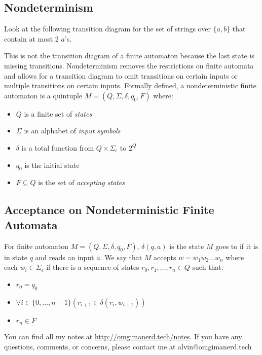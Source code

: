 \documentclass{math}
\begin{document}
\subsection*{Nondeterminism}
Look at the following transition diagram for the set of strings over \( \{a,b\}
\) that contain at most 2 \( a \)'s.
\begin{center}
\end{center}
This is not the transition diagram of a finite automaton because the last state
is missing transitions. Nondeterminism removes the restrictions on finite
automata and allows for a transition diagram to omit transitions on certain
inputs or multiple transitions on certain inputs. Formally defined, a
nondeterministic finite automaton is a quintuple \( M = (Q,\Sigma,\delta,
q_0,F) \) where:
\begin{itemize}
  \item \( Q \) is a finite set of \textit{states}
  \item \( \Sigma \) is an alphabet of \textit{input symbols}
  \item \( \delta \) is a total function from \( Q\times\Sigma_{\epsilon} \) to
  \( 2^Q \)
  \item \( q_0 \) is the initial state
  \item \( F\subseteq Q \) is the set of \textit{accepting states}
\end{itemize}

\subsection*{Acceptance on Nondeterministic Finite Automata}
For finite automaton \( M = (Q,\Sigma,\delta,q_0,F) \), \( \delta(q,a) \)
is the state \( M \) goes to if it is in state \( q \) and reads an input
\( a \). We say that \( M \) accepts \( w = w_1w_2\dots w_n \) where each
\( w_i\in\Sigma_{\epsilon} \) if there is a sequence of states \( r_0,r_1,
\dots,r_n\in Q \) such that:
\begin{itemize}
  \item \( r_0 = q_0 \)
  \item \( \forall{i}\in\{0,\dots,n-1\}(r_{i+1}\in\delta(r_i,w_{i+1})) \)
  \item \( r_n\in F \)
\end{itemize}

\begin{center}
  You can find all my notes at \url{http://omgimanerd.tech/notes}. If you have
  any questions, comments, or concerns, please contact me at
  alvin@omgimanerd.tech
\end{center}
\end{document}
